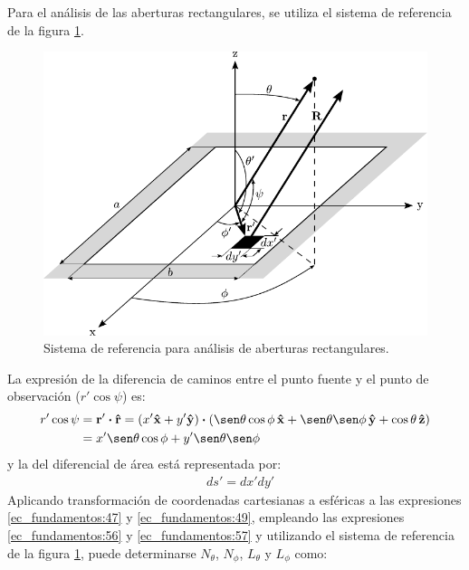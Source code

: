 Para el análisis de las aberturas rectangulares, se utiliza el sistema de referencia de la figura \ref{fig_fundamentos:13}.
\begin{figure} [H]
\centering 
\includegraphics[scale = 1]{Figures/Fundamentos/fundamentos_13.pdf}
\caption{Sistema de referencia para análisis de aberturas rectangulares.}
\label{fig_fundamentos:13}
\end{figure}
La expresión de la diferencia de caminos entre el punto fuente y el punto de observación ($r'\cos\psi$) es:
\begin{align}
\begin{split}
r'\cos\psi &= \mathbf{r}'\prodesc\versor{r} = \left(x'\versor{x} + y'\versor{y}\right)\prodesc\left(\sen\theta\cos\phi\,\versor{x} + \sen\theta\sen\phi\,\versor{y} + \cos\theta\,\versor{z}\right)\\
&= x'\sen\theta\cos\phi + y'\sen\theta\sen\phi
\end{split}
\label{ec_fundamentos:56}
\end{align}
y la del diferencial de área está representada por:
\begin{align}
&ds' = dx'dy'
\label{ec_fundamentos:57}
\end{align}
Aplicando transformación de coordenadas cartesianas a esféricas a las expresiones \eqref{ec_fundamentos:47} y \eqref{ec_fundamentos:49}, empleando las expresiones \eqref{ec_fundamentos:56} y \eqref{ec_fundamentos:57} y utilizando el sistema de referencia de la figura \ref{fig_fundamentos:13}, puede determinarse $N_{\theta}$, $N_{\phi}$, $L_{\theta}$ y $L_{\phi}$ como:
